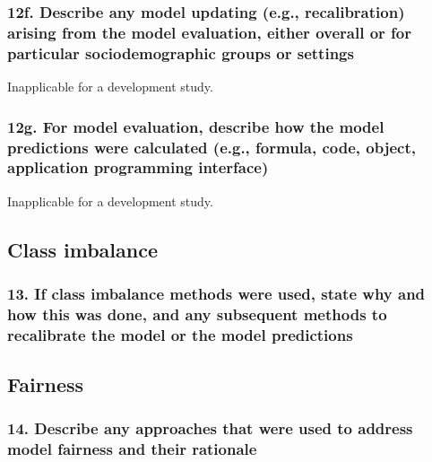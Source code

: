 \documentclass[
  letterpaper,
  DIV=11,
  numbers=noendperiod]{scrartcl}
\begin{document}
\subsubsection{12f. Describe any model updating (e.g., recalibration)
arising from the model evaluation, either overall or for particular
sociodemographic groups or
settings}\label{f.-describe-any-model-updating-e.g.-recalibration-arising-from-the-model-evaluation-either-overall-or-for-particular-sociodemographic-groups-or-settings}

Inapplicable for a development study.

\subsubsection{12g. For model evaluation, describe how the model
predictions were calculated (e.g., formula, code, object, application
programming
interface)}\label{g.-for-model-evaluation-describe-how-the-model-predictions-were-calculated-e.g.-formula-code-object-application-programming-interface}

Inapplicable for a development study.

\subsection{Class imbalance}\label{class-imbalance}

\subsubsection{13. If class imbalance methods were used, state why and
how this was done, and any subsequent methods to recalibrate the model
or the model
predictions}\label{if-class-imbalance-methods-were-used-state-why-and-how-this-was-done-and-any-subsequent-methods-to-recalibrate-the-model-or-the-model-predictions}

\subsection{Fairness}\label{fairness}

\subsubsection{14. Describe any approaches that were used to address
model fairness and their
rationale}\label{describe-any-approaches-that-were-used-to-address-model-fairness-and-their-rationale}
\end{document}

